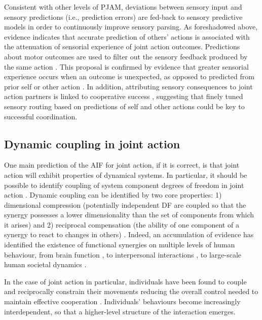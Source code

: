 Consistent with other levels of PJAM, deviations between sensory input and sensory predictions (i.e., prediction errors) are fed-back to sensory predictive models in order to continuously improve sensory parsing.  As foreshadowed above, evidence indicates that accurate prediction of others' actions is associated with the attenuation of sensorial experience of joint action outcomes.  Predictions about motor outcomes are used to filter out the sensory feedback produced by the same action \citep{Blakemore1999}.  This proposal is confirmed by evidence that greater sensorial experience occurs when an outcome is unexpected, as opposed to predicted from prior self or other action \citep{Sato2008}.  In addition, attributing sensory consequences to joint action partners is linked to cooperative success \citep{Chaminade2012}, suggesting that finely tuned sensory routing based on predictions of self and other actions could be key to successful coordination.

\subsection{Dynamic coupling in joint action\label{app2:dynamicCoupling}}

One main prediction of the AIF for joint action, if it is correct, is that joint action will exhibit properties of dynamical systems.  In particular, it should be possible to identify coupling of system component degrees of freedom in joint action \citep{Turvey1978,Schmidt1990}.  Dynamic coupling can be identified by two core properties:  1) dimensional compression (potentially independent DF are coupled so that the synergy possesses a lower dimensionality than the set of components from which it arises) and 2) reciprocal compensation (the ability of one component of a synergy to react to changes in others) \citep{Riley2011}.  Indeed, an accumulation of evidence has identified the existence of functional synergies on multiple levels of human behaviour, from brain function \citep{Yufik1998,Sengupta2013}, to interpersonal interactions \citep{Kelso2009,Riley2011,Fusaroli2014}, to large-scale human societal dynamics \citep{Nowak2017}.

In the case of joint action in particular, individuals have been found to couple and reciprocally constrain their movements reducing the overall control needed to maintain effective cooperation \citep{Ramenzoni2011,Ramenzoni2012,Riley2011,Schmidt1990}.  Individuals’ behaviours become increasingly interdependent, so that a higher-level structure of the interaction emerges.

